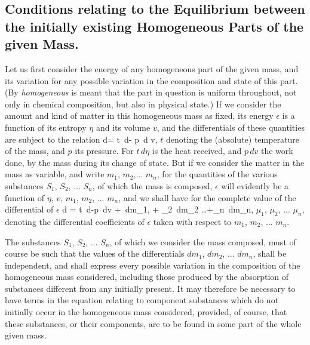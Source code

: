 \documentclass[12pt]{memoir}
\begin{document}
\subsection{Conditions relating to the Equilibrium between the initially existing Homogeneous Parts of the given Mass.}
Let us first consider the energy of any homogeneous part of the given mass, and its variation for any possible variation in the composition and state of this part. (By \textit{homogeneous} is meant that the part in question is uniform throughout, not only in chemical composition, but also in physical state.) If we consider the amount and kind of matter in this homogeneous mass as fixed, its energy $\epsilon$ is a function of its entropy $\eta$ and its volume $v$, and the differentials of these quantities are subject to the relation
\eqs
d\epsilon= t \,d\eta - p \,d v,   \label{11}
\eqe
$t$ denoting the (absolute) temperature of the mass, and $p$ its pressure. For $t\, d \eta$ is the heat received, and $p \,dv$ the work done, by the mass during its change of state. But if we consider the matter in the mass as variable, and write $m_1$, $m_2$,... $m_n$, for the quantities of the various substances $S_1$, $S_2$, ... $S_n$, of which the mass is composed, $\epsilon$ will evidently be a function of $\eta$, $v$, $m_1$, $m_2$, ... $m_n$, and we shall have for the complete value of the differential of $\epsilon$
\eqs
d \epsilon = t \,d\eta -p \,dv + \mu \,dm_1, + \mu_2 \,dm_2 \dots +\mu_n \,dm_n, \label{12}
\eqe
$\mu_1$, $\mu_2$, ... $\mu_n$, denoting the differential coefficients of $\epsilon$ taken with respect to $m_1$, $m_2$, ... $m_n$.

The substances $S_1$, $S_2$, ... $S_n$, of which we consider the mass composed, must of course be such that the values of the differentials $dm_1$, $dm_2$, ... $dm_n$, shall be independent, and shall express every possible variation in the composition of the homogeneous mass considered, including those produced by the absorption of substances different from any initially present. It may therefore be necessary to have terms in the equation relating to component substances which do not initially occur in the homogeneous mass considered, provided, of course, that these substances, or their components, are to be found in some part of the whole given mass.
\end{document}
